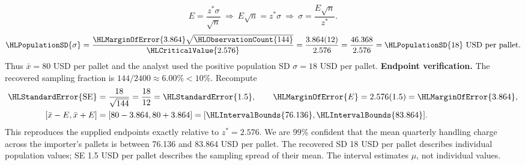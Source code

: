 \[E=\frac{z^*\sigma}{\sqrt n}\ \Longrightarrow\ E\sqrt n=z^*\sigma\ \Longrightarrow\ \sigma=\frac{E\sqrt n}{z^*}.\]
\[\HLPopulationSD{\sigma}=\frac{\HLMarginOfError{3.864}\sqrt{\HLObservationCount{144}}}{\HLCriticalValue{2.576}}=\frac{3.864(12)}{2.576}=\frac{46.368}{2.576}=\HLPopulationSD{18}\text{ USD per pallet}.\]
Thus $\bar x=80$ USD per pallet and the analyst used the positive population SD $\sigma=18$ USD per pallet.
\textbf{Endpoint verification.} The recovered sampling fraction is $144/2400\approx 6.00\%<10\%$. Recompute
\[\begin{aligned}
\HLStandardError{\mathrm{SE}}&=\frac{18}{\sqrt{144}}=\frac{18}{12}=\HLStandardError{1.5},\qquad \HLMarginOfError{E}=2.576(1.5)=\HLMarginOfError{3.864},\\
[\bar x-E,\bar x+E]&=[80-3.864,80+3.864]=[\HLIntervalBounds{76.136},\HLIntervalBounds{83.864}].
\end{aligned}\]
This reproduces the supplied endpoints exactly relative to $z^*=2.576$. We are 99\% confident that the mean quarterly handling charge across the importer's pallets is between 76.136 and 83.864 USD per pallet.
The recovered SD 18 USD per pallet describes individual population values; SE 1.5 USD per pallet describes the sampling spread of their mean. The interval estimates $\mu$, not individual values.
\clearpage
